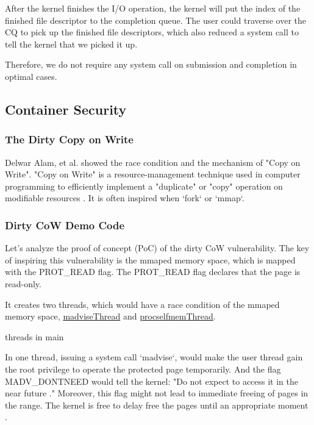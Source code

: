 \documentclass[12pt,a4paper]{article}
\begin{document}
After the kernel finishes the I/O operation, the kernel will put the index of the finished
file descriptor to the completion queue. The user could traverse over the CQ to pick up
the finished file descriptors, which also reduced a system call to tell the kernel that
we picked it up.

Therefore, we do not require any system call on submission and completion in optimal cases.

\subsection{Container Security}
\hypertarget{security}{}
\subsubsection{The Dirty Copy on Write}
Delwar Alam, et al. \cite{Study_Dirty_Cow} showed the race condition and the mechanism of
"Copy on Write". "Copy on Write" is a resource-management technique used in
computer programming to efficiently implement a "duplicate" or "copy" operation
on modifiable resources \cite{CoW_wiki}. It is often inspired when `fork` or `mmap`.

\subsubsection{Dirty CoW Demo Code}
Let's analyze the proof of concept (PoC) of the dirty CoW \cite{Dirty_CoW} vulnerability.
The key of inspiring this vulnerability is the mmaped memory space, which is mapped with
the PROT\_READ flag. The PROT\_READ flag declares that the page is read-only.


It creates two threads, which would have a race condition of the mmaped memory space,
\hyperlink{madvise}{madviseThread} and \hyperlink{procself}{procselfmemThread}.

\hypertarget{threads_main}{threads in main}


In one thread, issuing a system call `madvise`, would make the user thread gain the root
privilege to operate the protected page temporarily. And the flag MADV\_DONTNEED would
tell the kernel: "Do not expect to access it in the near future \cite{Madvise}." Moreover,
this flag might not lead to immediate freeing of pages in the range. The kernel is free
to delay free the pages until an appropriate moment \cite{Madvise}.
\end{document}
